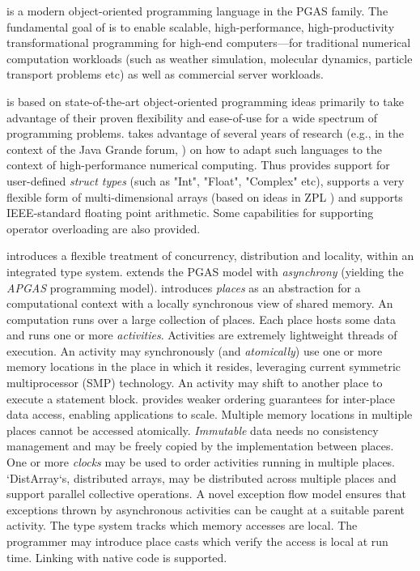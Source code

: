 \Xten{} is a modern object-oriented programming language
in the PGAS family. The fundamental goal of \Xten{} is to enable
scalable, high-performance, high-productivity transformational
programming for high-end computers---for traditional numerical
computation workloads (such as weather simulation, molecular dynamics,
particle transport problems etc) as well as commercial server
workloads.

\Xten{} is based on state-of-the-art object-oriented
programming ideas primarily to take advantage of their proven
flexibility and ease-of-use for a wide spectrum of programming
problems. \Xten{} takes advantage of several years of research (e.g.,
in the context of the Java Grande forum,
\cite{moreira00java,kava}) on how to adapt such languages to the context of
high-performance numerical computing. Thus \Xten{} provides support
for user-defined {\em struct types} (such as \xcd"Int", \xcd"Float",
\xcd"Complex" etc), supports a very
flexible form of multi-dimensional arrays (based on ideas in ZPL
\cite{zpl}) and supports IEEE-standard floating point arithmetic.
Some capabilities for supporting operator overloading are also provided.

{}\Xten{} introduces a flexible treatment of concurrency, distribution
and locality, within an integrated type system. \Xten{} extends the
PGAS model with {\em asynchrony} (yielding the {\em APGAS} programming
model). {}\Xten{} introduces {\em places} as an abstraction for a
computational context with a locally synchronous view of shared
memory. An \Xten{} computation runs over a large collection of places.
Each place hosts some data and runs one or more {\em
activities}. Activities are extremely lightweight threads of
execution. An activity may synchronously (and {\em atomically}) use
one or more memory locations in the place in which it resides,
leveraging current symmetric multiprocessor (SMP) technology.  
An activity may shift to another place to execute a statement block.
\Xten{} provides weaker ordering guarantees for
inter-place data access, enabling applications to scale.  
Multiple memory locations in multiple places cannot be
accessed atomically.  {\em
Immutable} data needs no consistency management and may be freely
copied by the implementation between places.  One or more {\em clocks}
may be used to order activities running in multiple
places.  \xcd`DistArray`s, distributed arrays,  may be distributed across
multiple 
places and  support parallel collective operations. A novel
exception flow model ensures that exceptions thrown by asynchronous
activities can be caught at a suitable parent activity.  The type
system tracks which memory accesses are local. The programmer may
introduce place casts which verify the access is local at run time.
Linking with native code is supported.

